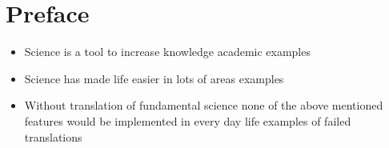 \chapter{Preface}

\begin{itemize}	
	\item Science is a tool to increase knowledge
	\subitem  academic examples
	\item Science has made life easier in lots of areas 
	\subitem	examples
	\item Without translation of fundamental science none of the above mentioned features would be implemented in every day life
	\subitem examples of failed translations
\end{itemize}	